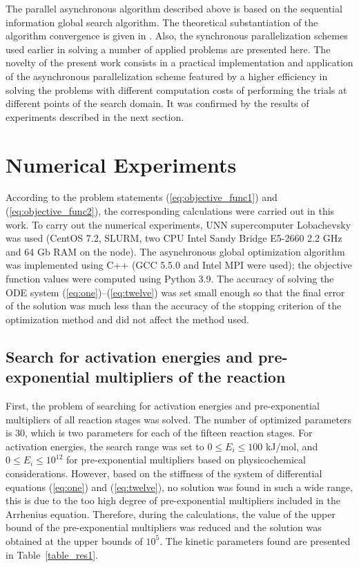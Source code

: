 \documentclass{svproc}
\begin{document}
The parallel asynchronous algorithm described above is based on the sequential information global search algorithm. The theoretical substantiation of the algorithm convergence is given in \cite{Strongin2000}. Also, the synchronous parallelization schemes used earlier in solving a number of applied problems \cite{Kalyulin2017,Modorskii2016} are presented here.
The novelty of the present work consists in a practical implementation and application of the asynchronous parallelization scheme featured by a higher efficiency in solving the problems with different computation costs of performing the trials at different points of the search domain. 
It was confirmed by the results of experiments described in the next section.

\section{Numerical Experiments}\label{Sec_Exp}

According to the problem statements (\ref{eq:objective_func1}) and (\ref{eq:objective_func2}), the corresponding calculations were carried out in this work.
To carry out the numerical experiments, UNN supercomputer Lobachevsky was used (CentOS 7.2, SLURM, two CPU Intel Sandy Bridge E5-2660 2.2 GHz and 64 Gb RAM on the node). The asynchronous global optimization algorithm was implemented using C++ (GCC 5.5.0 and Intel MPI were used); the objective function values were computed using Python 3.9.
The accuracy of solving the ODE system (\ref{eq:one})--(\ref{eq:twelve}) was set small enough so that the final error of the solution was much less than the accuracy of the stopping criterion of the optimization method and did not affect the method used.

\subsection{Search for activation energies and pre-exponential multipliers of the reaction}

First, the problem of searching for activation energies and pre-exponential multipliers of all reaction stages was solved. The number of optimized parameters is 30, which is two parameters for each of the fifteen reaction stages. For activation energies, the search range was set to $0 \leq E_i \leq 100$ kJ/mol, and $0 \leq E_i \leq 10^{12}$ for pre-exponential multipliers based on physicochemical considerations. However, based on the stiffness of the system of differential equations (\ref{eq:one}) and (\ref{eq:twelve}), no solution was found in such a wide range, this is due to the too high degree of pre-exponential multipliers included in the Arrhenius equation. Therefore, during the calculations, the value of the upper bound of the pre-exponential multipliers was reduced and the solution was obtained at the upper bounds of $10^5$. The kinetic parameters found are presented in Table~\ref{table_res1}.
\end{document}
